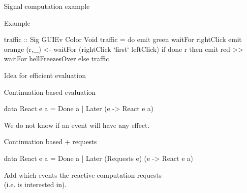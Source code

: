 \documentclass{beamer}
\begin{document}
\begin{frame}{Signal computation example}

\begin{block}{Example}
\vspace{-0.4cm}
\begin{center}
\end{center}
\vspace{-0.6cm}
\begin{code}
traffic :: Sig GUIEv Color Void
traffic = 
  do  emit green 
      waitFor rightClick
      emit orange
      (r,_) <- waitFor (rightClick `first` leftClick)
      if done r 
      then  emit red >> waitFor hellFreezesOver 
      else  traffic
\end{code}
\setlength{\mathindent}{\tmathindenta}
\vspace{-0.8cm}
\end{block}
\end{frame}

\begin{frame}{Idea for efficient evaluation}

\begin{block}{Continuation based evaluation}

\begin{code}
data React e a = Done a | Later (e -> React e a) 
\end{code}
We do not know if an event will have any effect.
\end{block}

\begin{block}{Continuation based + requests}
\begin{code}
data React e a = Done a | Later (Requests e) (e -> React e a) 
\end{code}
Add which events the reactive computation \alert{requests}\\ (i.e. is interested in).
\end{block}
\end{frame}
\end{document}
